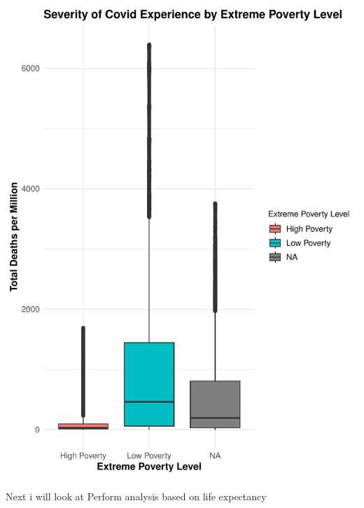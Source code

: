 \documentclass[12pt,preprint, authoryear]{elsarticle}
\let\origfigure\figure
\let\endorigfigure\endfigure
\renewenvironment{figure}[1][2] {
    \expandafter\origfigure\expandafter[H]
} {
    \endorigfigure
}
\numberwithin{equation}{section}
\numberwithin{figure}{section}
\numberwithin{table}{section}
\begin{document}
\begin{figure}

{\centering \includegraphics{Q1_files/figure-latex/Figure9-1} 

}

\caption{ Extreme poverty  \label{Figure9 }}\label{fig:Figure9}
\end{figure}

Next i will look at Perform analysis based on life expectancy

\begin{Shaded}
\begin{Highlighting}[]
\end{Highlighting}
\end{Shaded}
\end{document}
